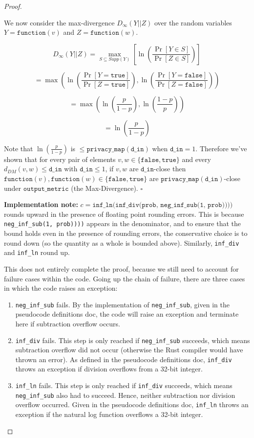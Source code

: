 \documentclass[11pt,a4paper]{article}
\newcommand{\zach}[1]{{ {\color{red}{(zach)~#1}}}}
\newcommand{\din}{\texttt{d\_in}}
\newcommand{\function}{\texttt{function}}
\theoremstyle{definition}
\begin{document}
\begin{proof}
\begin{enumerate}
    We now consider the max-divergence $D_{\infty}(Y||Z)$ over the random variables $Y = \function(v)$ and $Z = \function(w)$.
    
    \[
    D_{\infty}(Y||Z) = \max_{S \subseteq Supp(Y)}[\ln (\frac{\Pr[Y \in S]}{\Pr[Z \in S]})] 
    \]
    
    \[
    = \max(\ln (\frac{\Pr[Y = \texttt{true}]}{\Pr[Z = \texttt{true}]}), \ln(\frac{\Pr[Y = \texttt{false}]}{\Pr[Z = \texttt{false}]}))
    \]
    
    \[
    = \max(\ln (\frac{p}{1 - p}), \ln(\frac{1 - p}{p}))
    \]
    
    \[
    = \ln (\frac{p}{1 - p})
    \]
    
    Note that $\ln (\frac{p}{1 - p})$ is $\le \texttt{privacy\_map}(\din)$ when $\din = 1$. Therefore we've shown that for every pair of elements $v,w \in \{\texttt{false}, \texttt{true}\}$ and every $d_{DM}(v,w) \le \din$ with $\din \le 1$, if $v,w$ are $\din$-close then $\function(v),\function(w) \in \{\texttt{false},\texttt{true}\}$ are $\texttt{privacy\_map}(\din)$-close under $\texttt{output\_metric}$ (the Max-Divergence). $\square$
    
    \textbf{Implementation note:} $c = \texttt{inf\_ln(inf\_div(prob, neg\_inf\_sub(1, prob))))}$ rounds upward in the presence of floating point rounding errors. This is because \texttt{neg\_inf\_sub(1, prob))))} appears in the denominator, and to ensure that the bound holds even in the presence of rounding errors, the conservative choice is to round down (so the quantity as a whole is bounded above). Similarly, \texttt{inf\_div} and \texttt{inf\_ln} round up. 
    
    This does not entirely complete the proof, because we still need to account for failure cases within the code. Going up the chain of failure, there are three cases in which the code raises an exception: %
    \begin{enumerate}
        \item \texttt{neg\_inf\_sub} fails. By the implementation of \texttt{neg\_inf\_sub}, given in the pseudocode definitions doc, the code will raise an exception and terminate here if subtraction overflow occurs. 
        \item \texttt{inf\_div} fails. This step is only reached if \texttt{neg\_inf\_sub} succeeds, which means subtraction overflow did not occur (otherwise the Rust compiler would have thrown an error). As defined in the pseudocode definitions doc, \texttt{inf\_div} throws an exception if division overflows from a 32-bit integer. 
        \item \texttt{inf\_ln} fails. This step is only reached if \texttt{inf\_div} succeeds, which means \texttt{neg\_inf\_sub} also had to succeed. Hence, neither subtraction nor division overflow occurred. Given in the pseudocode definitions doc, \texttt{inf\_ln} throws an exception if the natural log function overflows a 32-bit integer. 
    \end{enumerate}
    

\end{enumerate}
\end{proof}
\end{document}
